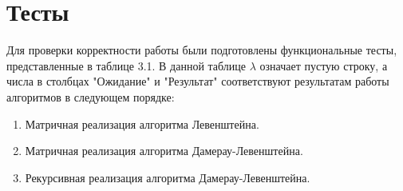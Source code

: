 \documentclass[12pt, a4paper]{report}
\begin{document}
	\newpage

	\section{Тесты}
	Для проверки корректности работы были подготовлены функциональные тесты, представленные в таблице 3.1. В данной таблице $\lambda$ означает пустую строку, а числа в столбцах "Ожидание" и "Результат" соответствуют результатам работы алгоритмов в следующем порядке:
	\begin{enumerate}
		\item Матричная реализация алгоритма Левенштейна.
		\item Матричная реализация алгоритма Дамерау-Левенштейна.
		\item Рекурсивная реализация алгоритма Дамерау-Левенштейна.
	\end{enumerate}
\end{document}
